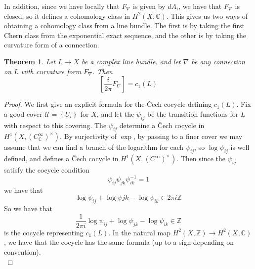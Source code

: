 \documentclass[psamsfonts, 12pt]{amsart}
\newtheorem{thm}{Theorem}[section]
\theoremstyle{definition}
\theoremstyle{remark}
\newcommand{\Z}{\mathbb{Z}}
\newcommand{\C}{\mathbb{C}}
\newcommand{\inv}{^{-1}}
\newcommand{\set}[1]{\left\lbrace #1 \right\rbrace}
\begin{document}
%
In addition, since we have locally that $F_\nabla$ is given by $dA_i$, we have that
$F_\nabla$ is closed, so it defines a cohomology class in $H^2(X,\C)$. This gives us
two ways of obtaining a cohomology class from a line bundle. The first is by taking
the first Chern class from the exponential exact sequence, and the other is
by taking the curvature form of a connection.
%
\begin{thm}
Let $L \to X$ be a complex line bundle, and let $\nabla$ be any connection on $L$ with
curvature form $F_\nabla$. Then
\[
\left[\frac{i}{2\pi}F_\nabla\right] = c_1(L)
\]
\end{thm}
%
\begin{proof}
We first give an explicit formula for the \v{C}ech cocycle defining $c_1(L)$.
Fix a good cover $\mathcal{U} = \set{U_i}$ for $X$, and let the $\psi_{ij}$ be the
transition functions for $L$ with respect to this covering. The $\psi_{ij}$
determine a \v{C}ech cocycle in $H^1(X, (C^\infty_\C)^\times)$. By surjectivity of
$\exp$, by passing to a finer cover we may assume that we can find a branch of the
logarithm for each $\psi_{ij}$, so $\log\psi_{ij}$ is well defined, and defines a
\v{C}ech cocycle in $H^1(X, (C^\infty)^\times)$. Then since
the $\psi_{ij}$ satisfy the cocycle condition
\[
\psi_{ij}\psi_{jk}\psi_{ik}\inv = 1
\]
we have that
\[
\log\psi_{ij} + \log\psi{jk} - \log\psi_{ik} \in 2\pi i\Z
\]
So we have that
\[
\frac{1}{2\pi i}\log\psi_{ij} + \log\psi_{jk} - \log\psi_{ik} \in \Z
\]
is the cocycle representing $c_1(L)$. In the natural map
$H^2(X,\Z) \to H^2(X,\C)$, we have that the cocycle has the same formula (up to a sign
depending on convention). \\


\end{proof}
\end{document}
